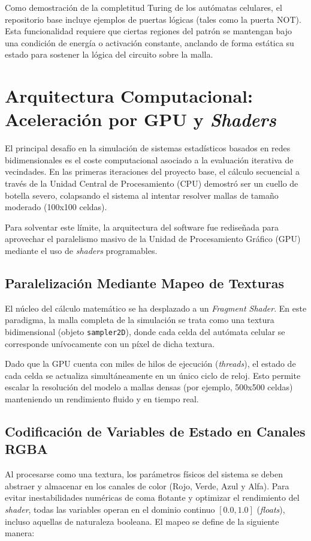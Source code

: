 \documentclass[12pt,a4paper]{article}
\begin{document}
Como demostración de la completitud Turing de los autómatas celulares, el repositorio base incluye ejemplos de puertas lógicas (tales como la puerta NOT). Esta funcionalidad requiere que ciertas regiones del patrón se mantengan bajo una condición de energía o activación constante, anclando de forma estática su estado para sostener la lógica del circuito sobre la malla.


\section{Arquitectura Computacional: Aceleración por GPU y \textit{Shaders}}

El principal desafío en la simulación de sistemas estadísticos basados en redes bidimensionales es el coste computacional asociado a la evaluación iterativa de vecindades. En las primeras iteraciones del proyecto base, el cálculo secuencial a través de la Unidad Central de Procesamiento (CPU) demostró ser un cuello de botella severo, colapsando el sistema al intentar resolver mallas de tamaño moderado (100x100 celdas).

Para solventar este límite, la arquitectura del software fue rediseñada para aprovechar el paralelismo masivo de la Unidad de Procesamiento Gráfico (GPU) mediante el uso de \textit{shaders} programables.

\subsection{Paralelización Mediante Mapeo de Texturas}
El núcleo del cálculo matemático se ha desplazado a un \textit{Fragment Shader}. En este paradigma, la malla completa de la simulación se trata como una textura bidimensional (objeto \texttt{sampler2D}), donde cada celda del autómata celular se corresponde unívocamente con un píxel de dicha textura. 

Dado que la GPU cuenta con miles de hilos de ejecución (\textit{threads}), el estado de cada celda se actualiza simultáneamente en un único ciclo de reloj. Esto permite escalar la resolución del modelo a mallas densas (por ejemplo, 500x500 celdas) manteniendo un rendimiento fluido y en tiempo real.

\subsection{Codificación de Variables de Estado en Canales RGBA}
Al procesarse como una textura, los parámetros físicos del sistema se deben abstraer y almacenar en los canales de color (Rojo, Verde, Azul y Alfa). Para evitar inestabilidades numéricas de coma flotante y optimizar el rendimiento del \textit{shader}, todas las variables operan en el dominio continuo $[0.0, 1.0]$ (\textit{floats}), incluso aquellas de naturaleza booleana. El mapeo se define de la siguiente manera:
\end{document}
